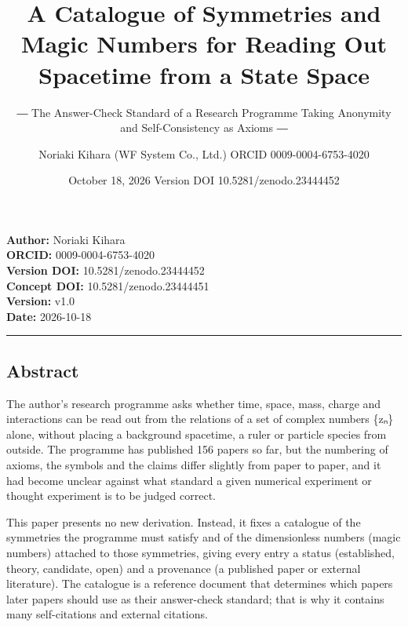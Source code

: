 \documentclass[
  a4paper,
]{article}
\title{A Catalogue of Symmetries and Magic Numbers for Reading Out
Spacetime from a State Space}
\subtitle{― The Answer-Check Standard of a Research Programme Taking
Anonymity and Self-Consistency as Axioms ―}
\author{Noriaki Kihara (WF System Co., Ltd.) ORCID 0009-0004-6753-4020}
\date{October 18, 2026 Version DOI 10.5281/zenodo.23444452}
\begin{document}
\maketitle

\textbf{Author:} Noriaki Kihara\\
\textbf{ORCID:} 0009-0004-6753-4020\\
\textbf{Version DOI:} 10.5281/zenodo.23444452\\
\textbf{Concept DOI:} 10.5281/zenodo.23444451\\
\textbf{Version:} v1.0\\
\textbf{Date:} 2026-10-18

\begin{center}\rule{0.5\linewidth}{0.5pt}\end{center}

\subsection{Abstract}\label{abstract}

The author's research programme asks whether time, space, mass, charge
and interactions can be read out from the relations of a set of complex
numbers \{zₙ\} alone, without placing a background spacetime, a ruler or
particle species from outside. The programme has published 156 papers so
far, but the numbering of axioms, the symbols and the claims differ
slightly from paper to paper, and it had become unclear against what
standard a given numerical experiment or thought experiment is to be
judged correct.

This paper presents no new derivation. Instead, it fixes a catalogue of
the symmetries the programme must satisfy and of the dimensionless
numbers (magic numbers) attached to those symmetries, giving every entry
a status (established, theory, candidate, open) and a provenance (a
published paper or external literature). The catalogue is a reference
document that determines which papers later papers should use as their
answer-check standard; that is why it contains many self-citations and
external citations.
\end{document}
